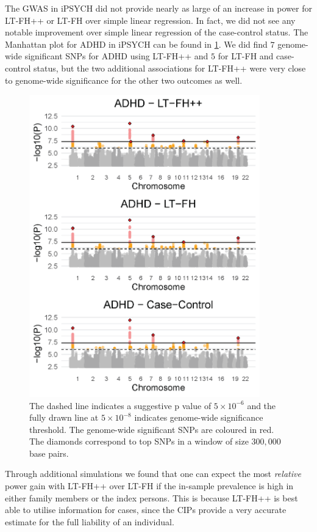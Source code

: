The GWAS in iPSYCH did not provide nearly as large of an increase in power for LT-FH++ or LT-FH over simple linear regression. In fact, we did not see any notable improvement over simple linear regression of the case-control status. The Manhattan plot for ADHD in iPSYCH can be found in \cref{fig:LTFH++_manhattanADHD}. We did find $ 7 $ genome-wide significant SNPs for ADHD using LT-FH++ and $ 5 $ for LT-FH and case-control status, but the two additional associations for LT-FH++ were very close to genome-wide significance for the other two outcomes as well.
\begin{figure}
	\includegraphics[width=10cm]{results/manhattanPlot_ADHD.png}
	\caption[Manhattan plots for LT-FH++, LT-FH, and case-control GWAS of ADHD in the iPSYCH data]{The dashed line indicates a suggestive p value of $ 5\times 10^{-6} $ and the fully drawn line at $ 5\times 10^{-8} $ indicates genome-wide significance threshold. The genome-wide significant SNPs are coloured in red. The diamonds correspond to top SNPs in a window of size $ 300,000 $ base pairs.}	
	\label{fig:LTFH++_manhattanADHD}
\end{figure}
Through additional simulations we found that one can expect the most \textit{relative} power gain with LT-FH++ over LT-FH if the in-sample prevalence is high in either family members or the index persons. This is because LT-FH++ is best able to utilise information for cases, since the CIPs provide a very accurate estimate for the full liability of an individual.